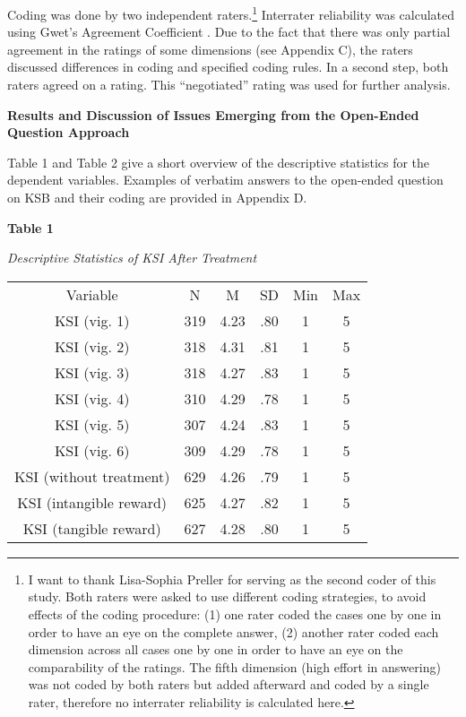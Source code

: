 \documentclass{article}
\begin{document}
Coding was done by two independent raters.\footnote{I want to thank Lisa-Sophia Preller for serving as the second coder of this study. Both raters were asked to use different coding strategies, to avoid effects of the coding procedure: (1) one rater coded the cases one by one in order to have an eye on the complete answer, (2) another rater coded each dimension across all cases one by one in order to have an eye on the comparability of the ratings. The fifth dimension (high effort in answering) was not coded by both raters but added afterward and coded by a single rater, therefore no interrater reliability is calculated here.} Interrater reliability was calculated using Gwet's Agreement Coefficient \parencite[][AC]{Gwet2014}. Due to the fact that there was only partial agreement in the ratings of some dimensions (see Appendix C), the raters discussed differences in coding and specified coding rules. In a second step, both raters agreed on a rating. This “negotiated” rating was used for further analysis.



\textbf{Results and Discussion of Issues Emerging from the Open-Ended Question Approach}

Table 1 and Table 2 give a short overview of the descriptive statistics for the dependent variables. Examples of verbatim answers to the open-ended question on KSB and their coding are provided in Appendix D.

\textbf{Table 1}

\emph{Descriptive Statistics of KSI After Treatment}


\begin{table}

  
\begin{tabular}{c  c  c  c  c  c}

  Variable & N & M & SD & Min & Max\\
KSI (vig. 1) & 319 & 4.23 & .80 & 1 & 5\\
KSI (vig. 2) & 318 & 4.31 & .81 & 1 & 5\\
KSI (vig. 3) & 318 & 4.27 & .83 & 1 & 5\\
KSI (vig. 4) & 310 & 4.29 & .78 & 1 & 5\\
KSI (vig. 5) & 307 & 4.24 & .83 & 1 & 5\\
KSI (vig. 6) & 309 & 4.29 & .78 & 1 & 5\\
KSI (without treatment) & 629 & 4.26 & .79 & 1 & 5\\
KSI (intangible reward) & 625 & 4.27 & .82 & 1 & 5\\
KSI (tangible reward) & 627 & 4.28 & .80 & 1 & 5\\


\end{tabular}


\end{table}
\end{document}
